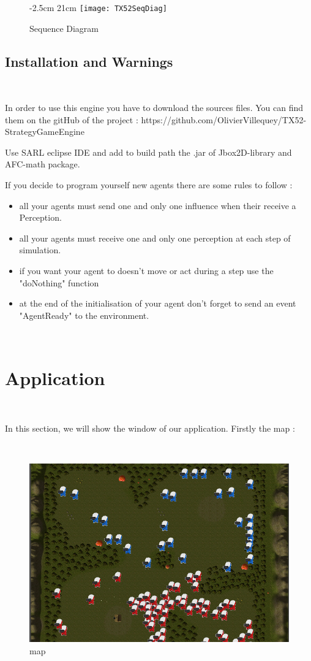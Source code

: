 \documentclass[a4paper,10pt]{book}
\begin{document}
\begin{figure}[!ht]
  -2.5cm 21cm
 \centering
 \texttt{[image: TX52SeqDiag]}
 \caption{Sequence Diagram}
\end{figure}

\newpage
\section {Installation and Warnings}

~

In order to use this engine you have to download the sources files. You can find them on the gitHub of the project : https://github.com/OlivierVillequey/TX52-StrategyGameEngine

Use SARL eclipse IDE and add to build path the .jar of Jbox2D-library and AFC-math package.

If you decide to program yourself new agents there are some rules to follow : 
\begin{itemize}
\item all your agents must send one and only one influence when their receive a Perception.
\item all your agents must receive one and only one perception at each step of simulation.
\item if you want your agent to doesn't move or act during a step use the "doNothing" function
\item at the end of the initialisation of your agent don't forget to send an event "AgentReady" to the environment.
\end{itemize}

~

\chapter {Application}

~

In this section, we will show the window of our application. Firstly the map :

~

\begin{figure}[h]
 \centering
 \includegraphics[scale=0.5]{GUI2}
 \caption{map}
\end{figure}
\end{document}
